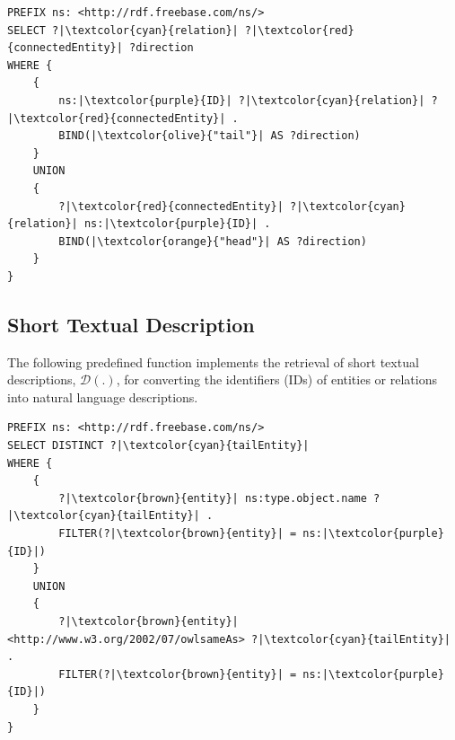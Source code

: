 \lstset{language=SPARQL}
\begin{lstlisting}
PREFIX ns: <http://rdf.freebase.com/ns/>
SELECT ?|\textcolor{cyan}{relation}| ?|\textcolor{red}{connectedEntity}| ?direction
WHERE {
    {
        ns:|\textcolor{purple}{ID}| ?|\textcolor{cyan}{relation}| ?|\textcolor{red}{connectedEntity}| .
        BIND(|\textcolor{olive}{"tail"}| AS ?direction)
    }
    UNION
    {
        ?|\textcolor{red}{connectedEntity}| ?|\textcolor{cyan}{relation}| ns:|\textcolor{purple}{ID}| .
        BIND(|\textcolor{orange}{"head"}| AS ?direction)
    }
}
\end{lstlisting}

\subsection{Short Textual Description}\label{appendix:short_D}
The following predefined function implements the retrieval of short textual descriptions, $\mathcal{D}(.)$, for converting the identifiers (IDs) of entities or relations into natural language descriptions.



\lstset{language=SPARQL}
\begin{lstlisting}
PREFIX ns: <http://rdf.freebase.com/ns/>
SELECT DISTINCT ?|\textcolor{cyan}{tailEntity}|
WHERE {
    {    
        ?|\textcolor{brown}{entity}| ns:type.object.name ?|\textcolor{cyan}{tailEntity}| .
        FILTER(?|\textcolor{brown}{entity}| = ns:|\textcolor{purple}{ID}|)  
    }  
    UNION
    {    
        ?|\textcolor{brown}{entity}| <http://www.w3.org/2002/07/owlsameAs> ?|\textcolor{cyan}{tailEntity}| .    
        FILTER(?|\textcolor{brown}{entity}| = ns:|\textcolor{purple}{ID}|)  
    }
}

\end{lstlisting}


